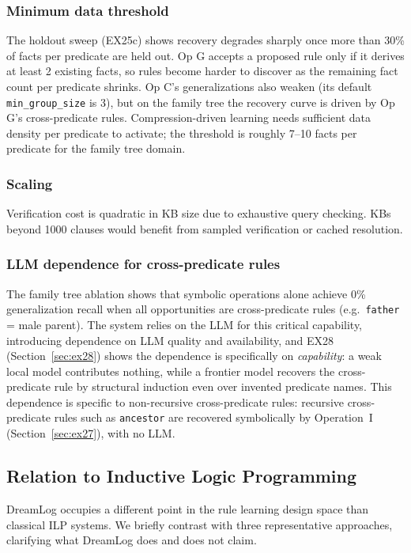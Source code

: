 \documentclass[10pt,conference]{IEEEtran}
\begin{document}
\subsubsection{Minimum data threshold} The holdout sweep (EX25c) shows recovery degrades sharply once more than 30\% of facts per predicate are held out. Op G accepts a proposed rule only if it derives at least 2 existing facts, so rules become harder to discover as the remaining fact count per predicate shrinks. Op C's generalizations also weaken (its default \texttt{min\_group\_size} is 3), but on the family tree the recovery curve is driven by Op G's cross-predicate rules. Compression-driven learning needs sufficient data density per predicate to activate; the threshold is roughly 7--10 facts per predicate for the family tree domain.

\subsubsection{Scaling} Verification cost is quadratic in KB size due to exhaustive query checking. KBs beyond 1000 clauses would benefit from sampled verification or cached resolution.

\subsubsection{LLM dependence for cross-predicate rules} The family tree ablation shows that symbolic operations alone achieve 0\% generalization recall when all opportunities are cross-predicate rules (e.g.\ \texttt{father} = male parent). The system relies on the LLM for this critical capability, introducing dependence on LLM quality and availability, and EX28 (Section~\ref{sec:ex28}) shows the dependence is specifically on \emph{capability}: a weak local model contributes nothing, while a frontier model recovers the cross-predicate rule by structural induction even over invented predicate names. This dependence is specific to non-recursive cross-predicate rules: recursive cross-predicate rules such as \texttt{ancestor} are recovered symbolically by Operation~I (Section~\ref{sec:ex27}), with no LLM.

\subsection{Relation to Inductive Logic Programming}
\label{sec:ilp_discussion}

DreamLog occupies a different point in the rule learning design space than classical ILP systems. We briefly contrast with three representative approaches, clarifying what DreamLog does and does not claim.
\end{document}
